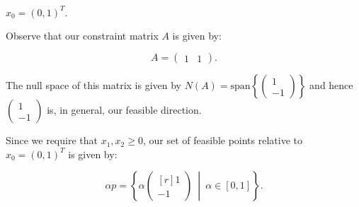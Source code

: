 $x_0 = (0, 1)^T.$

\begin{solution}
  Observe that our constraint matrix $A$ is given by:

  $$
  A = \begin{pmatrix}
    1 & 1
  \end{pmatrix}.
  $$

  The null space of this matrix is given by $N(A) = \text{span}\left\{ \begin{pmatrix} 1 \\ -1 \end{pmatrix} \right\}$
  and hence $\begin{pmatrix} 1 \\ -1 \end{pmatrix}$ is, in general, our feasible direction.

  Since we require that $x_1, x_2 \geq 0$, our set of feasible points relative to $x_0 = (0, 1)^T$ is given by:

  $$
  \alpha p = \left\{ \alpha \begin{pmatrix*}[r] 1 \\ -1 \end{pmatrix*} \ \middle| \ \alpha \in [0, 1] \right\}.
  $$


  \ \\
\end{solution}